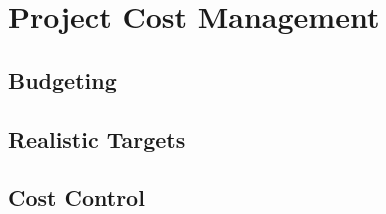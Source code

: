 \chapter{Project Cost Management}

\section{Budgeting}

\section{Realistic Targets}

\section{Cost Control}